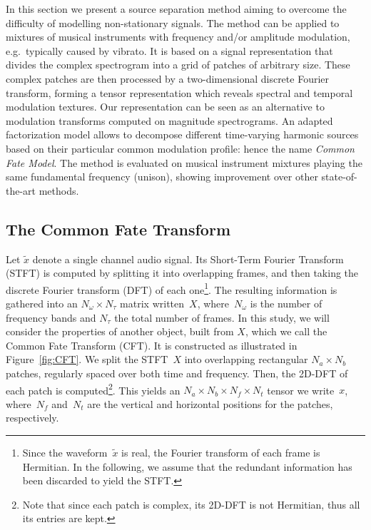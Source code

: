 In this section we present a source separation method aiming to overcome the difficulty of modelling non-stationary signals. The method can be applied to mixtures of musical instruments with frequency and/or amplitude modulation, e.g.\ typically caused by vibrato. It is based on a signal representation that divides the complex spectrogram into a grid of patches of arbitrary size. These complex patches are then processed by a two-dimensional discrete Fourier transform, forming a tensor representation which reveals spectral and temporal modulation textures. Our representation can be seen as an alternative to modulation transforms computed on magnitude spectrograms. An adapted factorization model allows to decompose different time-varying harmonic sources based on their particular common modulation profile: hence the name \emph{Common Fate Model}. The method is evaluated on musical instrument mixtures playing the same fundamental frequency (unison), showing improvement over other state-of-the-art methods.

\label{sec:model}

\subsection{The Common Fate Transform}

\label{sub:CFT}

Let $\tilde{x}$ denote a single channel audio signal.
Its Short-Term Fourier Transform (STFT) is computed by splitting it
into overlapping frames, and then taking the discrete Fourier transform (DFT)
of each one\footnote{Since the waveform~$\tilde{x}$ is real, the Fourier transform of
each frame is Hermitian. In the following, we assume that the redundant
information has been discarded to yield the STFT.}. The resulting information is gathered into an $N_{\omega}\times N_{\tau}$
matrix written~$X$, where~$N_{\omega}$ is the number of frequency
bands and $N_{\tau}$ the total number of frames.
%
In this study, we will consider the properties of another object,
built from $X$, which we call the Common Fate Transform (CFT). It
is constructed as illustrated in Figure~\ref{fig:CFT}.
We split the STFT~$X$ into overlapping rectangular $N_{a}\times N_{b}$
patches, regularly spaced over both time and frequency. Then, the
2D-DFT of each patch is computed\footnote{Note that since each patch is complex, its 2D-DFT is not Hermitian,
thus all its entries are kept.}. This yields an $N_{a}\times N_{b}\times N_{f}\times N_{t}$ tensor we write~$x$,
where~$N_{f}$ and~$N_{t}$ are the vertical and horizontal
positions for the patches, respectively.

